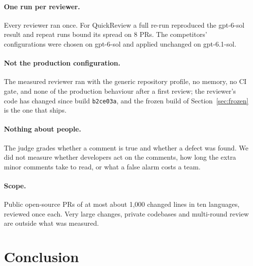 \documentclass[11pt,a4paper]{article}
\newcommand{\qcr}{QuickReview}
\newcommand{\code}[1]{\texttt{#1}}
\begin{document}
\paragraph{One run per reviewer.} Every reviewer ran once. For \qcr{} a full
re-run reproduced the gpt-6-sol result and repeat runs bound its spread on 8
PRs. The competitors' configurations were chosen on gpt-6-sol and
applied unchanged on gpt-6.1-sol.

\paragraph{Not the production configuration.} The measured reviewer ran
with the generic repository profile, no memory, no CI gate, and none of the
production behaviour after a first review; the reviewer's code has changed
since build \code{b2ce03a}, and the frozen build of Section~\ref{sec:frozen}
is the one that ships.

\paragraph{Nothing about people.} The judge grades whether a comment is
true and whether a defect was found. We did not measure whether developers
act on the comments, how long the extra minor comments take to read, or what
a false alarm costs a team.

\paragraph{Scope.} Public open-source PRs of at most about 1{,}000 changed
lines in ten languages, reviewed once each. Very large changes, private
codebases and multi-round review are outside what was measured.

\section{Conclusion}
\label{sec:conclusion}
\end{document}

